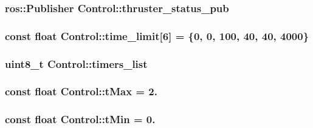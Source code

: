 \subsubsection[{\texorpdfstring{thruster\+\_\+status\+\_\+pub}{thruster_status_pub}}]{\setlength{\rightskip}{0pt plus 5cm}ros\+::\+Publisher Control\+::thruster\+\_\+status\+\_\+pub\hspace{0.3cm}{\ttfamily [private]}}\hypertarget{classControl_a914384fbf8c6a3e58a485fc91c44d374}{}\label{classControl_a914384fbf8c6a3e58a485fc91c44d374}
\subsubsection[{\texorpdfstring{time\+\_\+limit}{time_limit}}]{\setlength{\rightskip}{0pt plus 5cm}const float Control\+::time\+\_\+limit\mbox{[}6\mbox{]} = \{0, 0, 100, 40, 40, 4000\}\hspace{0.3cm}{\ttfamily [private]}}\hypertarget{classControl_ab6952c55a537ef9c92a874a72d5781b5}{}\label{classControl_ab6952c55a537ef9c92a874a72d5781b5}
\subsubsection[{\texorpdfstring{timers\+\_\+list}{timers_list}}]{\setlength{\rightskip}{0pt plus 5cm}uint8\+\_\+t Control\+::timers\+\_\+list\hspace{0.3cm}{\ttfamily [private]}}\hypertarget{classControl_ac06b4442ca2a5141fe6d8637f0f4a169}{}\label{classControl_ac06b4442ca2a5141fe6d8637f0f4a169}
\subsubsection[{\texorpdfstring{t\+Max}{tMax}}]{\setlength{\rightskip}{0pt plus 5cm}const float Control\+::t\+Max = 2.\hspace{0.3cm}{\ttfamily [private]}}\hypertarget{classControl_aa0dfe0af55adef6ba02ba98cd538de6f}{}\label{classControl_aa0dfe0af55adef6ba02ba98cd538de6f}
\subsubsection[{\texorpdfstring{t\+Min}{tMin}}]{\setlength{\rightskip}{0pt plus 5cm}const float Control\+::t\+Min = 0.\hspace{0.3cm}{\ttfamily [private]}}\hypertarget{classControl_a7cccef9b9893cbc515c85be334d34108}{}\label{classControl_a7cccef9b9893cbc515c85be334d34108}
